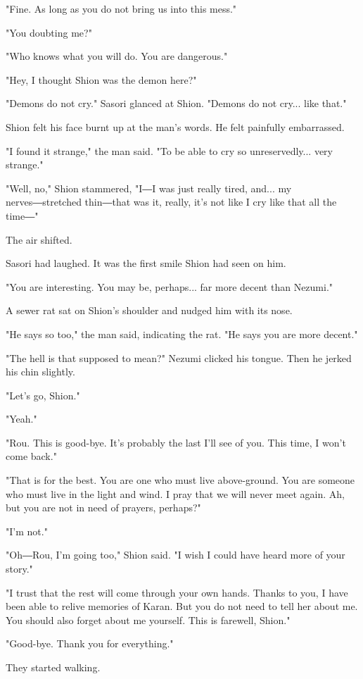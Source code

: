 "Fine. As long as you do not bring us into this mess."

"You doubting me?"

"Who knows what you will do. You are dangerous."

"Hey, I thought Shion was the demon here?"

"Demons do not cry." Sasori glanced at Shion. "Demons do not cry... like
that."

Shion felt his face burnt up at the man's words. He felt painfully
embarrassed.

"I found it strange," the man said. "To be able to cry so
unreservedly... very strange."

"Well, no," Shion stammered, "I―I was just really tired, and... my
nerves―stretched thin―that was it, really, it's not like I cry like that
all the time―"

The air shifted.

Sasori had laughed. It was the first smile Shion had seen on him.

"You are interesting. You may be, perhaps... far more decent than
Nezumi."

A sewer rat sat on Shion's shoulder and nudged him with its nose.

"He says so too," the man said, indicating the rat. "He says you are
more decent."

"The hell is that supposed to mean?" Nezumi clicked his tongue. Then he
jerked his chin slightly.

"Let's go, Shion."

"Yeah."

"Rou. This is good-bye. It's probably the last I'll see of you. This
time, I won't come back."

"That is for the best. You are one who must live above-ground. You are
someone who must live in the light and wind. I pray that we will never
meet again. Ah, but you are not in need of prayers, perhaps?"

"I'm not."

"Oh―Rou, I'm going too," Shion said. "I wish I could have heard more of
your story."

"I trust that the rest will come through your own hands. Thanks to you,
I have been able to relive memories of Karan. But you do not need to
tell her about me. You should also forget about me yourself. This is
farewell, Shion."

"Good-bye. Thank you for everything."

They started walking.

